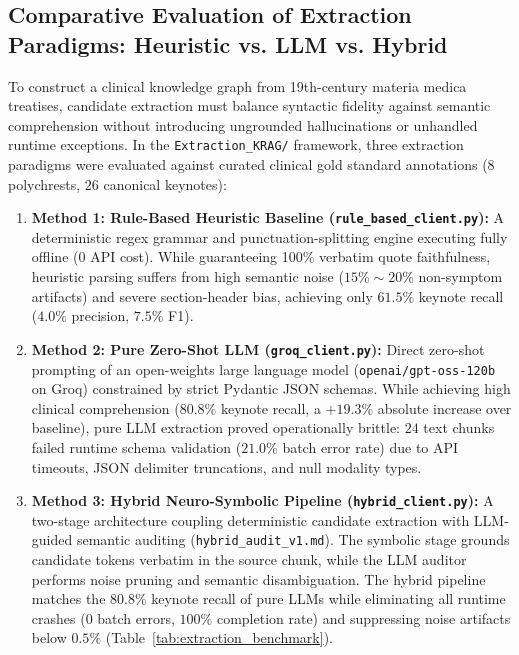 \documentclass[10pt,twocolumn,letterpaper]{article}
\begin{document}
\subsection{Comparative Evaluation of Extraction Paradigms: Heuristic vs. LLM vs. Hybrid}
To construct a clinical knowledge graph from 19th-century materia medica treatises, candidate extraction must balance syntactic fidelity against semantic comprehension without introducing ungrounded hallucinations or unhandled runtime exceptions. In the \texttt{Extraction\_KRAG/} framework, three extraction paradigms were evaluated against curated clinical gold standard annotations ($8$ polychrests, $26$ canonical keynotes):
\begin{enumerate}
  \item \textbf{Method 1: Rule-Based Heuristic Baseline (\texttt{rule\_based\_client.py}):} A deterministic regex grammar and punctuation-splitting engine executing fully offline ($0$ API cost). While guaranteeing 100\% verbatim quote faithfulness, heuristic parsing suffers from high semantic noise ($15\% \sim 20\%$ non-symptom artifacts) and severe section-header bias, achieving only $61.5\%$ keynote recall ($4.0\%$ precision, $7.5\%$ F1).
  \item \textbf{Method 2: Pure Zero-Shot LLM (\texttt{groq\_client.py}):} Direct zero-shot prompting of an open-weights large language model (\texttt{openai/gpt-oss-120b} on Groq) constrained by strict Pydantic JSON schemas. While achieving high clinical comprehension ($80.8\%$ keynote recall, a $+19.3\%$ absolute increase over baseline), pure LLM extraction proved operationally brittle: $24$ text chunks failed runtime schema validation ($21.0\%$ batch error rate) due to API timeouts, JSON delimiter truncations, and null modality types.
  \item \textbf{Method 3: Hybrid Neuro-Symbolic Pipeline (\texttt{hybrid\_client.py}):} A two-stage architecture coupling deterministic candidate extraction with LLM-guided semantic auditing (\texttt{hybrid\_audit\_v1.md}). The symbolic stage grounds candidate tokens verbatim in the source chunk, while the LLM auditor performs noise pruning and semantic disambiguation. The hybrid pipeline matches the $80.8\%$ keynote recall of pure LLMs while eliminating all runtime crashes ($0$ batch errors, $100\%$ completion rate) and suppressing noise artifacts below $0.5\%$ (Table~\ref{tab:extraction_benchmark}).
\end{enumerate}
\end{document}
